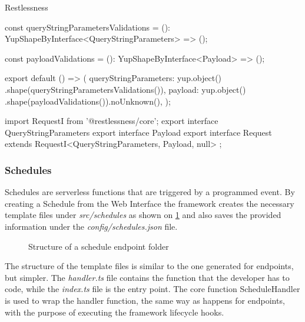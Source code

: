 \begin{chapter}{Restlessness}
    \bigskip
    \begin{code}[caption=validations.ts content, label={lst:validations_ts}]
const queryStringParametersValidations =
  (): YupShapeByInterface<QueryStringParameters>  => ({});

const payloadValidations =
  (): YupShapeByInterface<Payload> => ({});

export default () => ({
  queryStringParameters: yup.object()
    .shape(queryStringParametersValidations()),
  payload: yup.object()
    .shape(payloadValidations()).noUnknown(),
});
    \end{code}

    \bigskip
    \begin{code}[caption=interfaces.ts content, label={lst:interfaces_ts}]
import { RequestI } from '@restlessness/core';
export interface QueryStringParameters {}
export interface Payload {}
export interface Request extends
    RequestI<QueryStringParameters, Payload, null> {};
    \end{code}

    \subsubsection{Schedules}
    \label{subsec:schedules}
    Schedules are serverless functions that are triggered by a programmed event.
    By creating a Schedule from the Web Interface the framework creates the necessary
    template files under \textit{src/schedules} as shown on
    \ref{fig:new_schedule_folder_structure} and also saves the provided information
    under the \textit{config/schedules.json} file.

    \begin{figure}
        \begin{minipage}{\linewidth}
        \end{minipage}
        \caption{Structure of a schedule endpoint folder}
        \label{fig:new_schedule_folder_structure}
    \end{figure}

    The structure of the template files is similar to the one generated for endpoints,
    but simpler. The \textit{handler.ts} file contains the function that the developer
    has to code, while the \textit{index.ts} file is the entry point.
    The core function ScheduleHandler is used to wrap the handler function, the same
    way as happens for endpoints, with the purpose of executing the framework lifecycle
    hooks.


\end{chapter}
